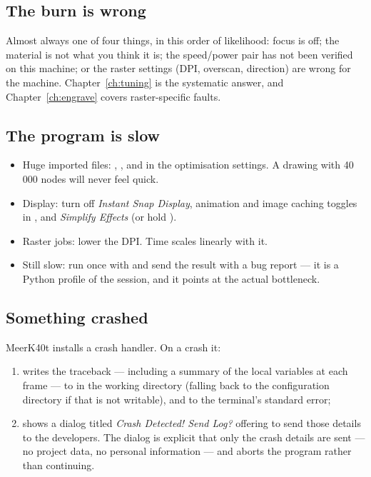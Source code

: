 \subsection*{The burn is wrong}

Almost always one of four things, in this order of likelihood: focus is off; the
material is not what you think it is; the speed/power pair has not been verified
on this machine; or the raster settings (DPI, overscan, direction) are wrong for
the machine. Chapter~\ref{ch:tuning} is the systematic answer, and
Chapter~\ref{ch:engrave} covers raster-specific faults.

\subsection*{The program is slow}

\begin{itemize}
  \item Huge imported files: , , and  in the optimisation
        settings. A drawing with 40\,000 nodes will never feel quick.
  \item Display: turn off \emph{Instant Snap Display}, animation and image
        caching toggles in , and \emph{Simplify
        Effects} (or hold ).
  \item Raster jobs: lower the DPI. Time scales linearly with it.
  \item Still slow: run once with  and send the result with a
        bug report --- it is a Python profile of the session, and it points at the
        actual bottleneck.
\end{itemize}

\subsection*{Something crashed}

MeerK40t installs a crash handler. On a crash it:

\begin{enumerate}[label=\arabic*.,leftmargin=1.4em]
  \item writes the traceback --- including a summary of the local variables at
        each frame --- to  in the working
        directory (falling back to the configuration directory if that is not
        writable), and to the terminal's standard error;
  \item shows a dialog titled \emph{Crash Detected! Send Log?} offering to send
        those details to the developers. The dialog is explicit that only the
        crash details are sent --- no project data, no personal information ---
        and  aborts the program rather than continuing.
\end{enumerate}

